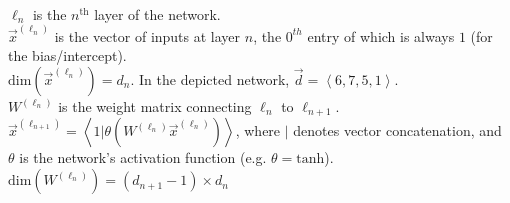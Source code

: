 \documentclass[10pt]{article}
\newcommand\vectorliteral[1]{\left<{#1}\right>}
\begin{document}
\\

\noindent
$\ell_n$ is the $n^\text{th}$ layer of the network.\\
$\vec{x}^{(\ell_n)}$ is the vector of inputs at layer $n$, the $0^{th}$ entry of which is always $1$ (for the bias/intercept).\\
$\text{dim}(\vec{x}^{(\ell_n)}) = d_n$. In the depicted network, $\vec{d} = \vectorliteral{6, 7, 5, 1}$.\\
$W^{(\ell_n)}$ is the weight matrix connecting $\ell_n$ to $\ell_{n+1}$.\\
$\vec{x}^{(\ell_{n+1})} = \vectorliteral{1 | \theta(W^{(\ell_n)}\vec{x}^{(\ell_n)})}$, where $|$ denotes vector concatenation, and $\theta$ is the network's activation function (e.g. $\theta = \text{tanh}$).\\
$\text{dim}(W^{(\ell_n)}) = (d_{n+1}-1) \times d_n$
\end{document}
